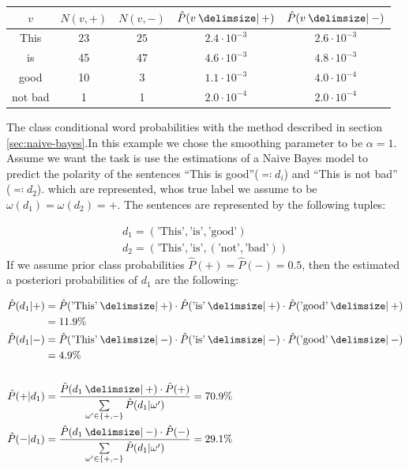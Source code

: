 \begin{center}
\begin{tabular}{|c|c|c|c|c}
$v$ & $N(v, +)$ & $N(v,-)$ & $\hat{P}(v\given +)$ & $\hat{P}(v \given -)$ \\
\hline
This & $23$ & $25$ & $2.4\cdot 10^{-3}$  & $2.6 \cdot 10^{-3}$\\
is & 45 & 47 & $4.6\cdot 10^{-3}$ &  $4.8\cdot 10^{-3}$ \\
good & 10 & 3 & $1.1 \cdot 10^{-3}$ & $4.0 \cdot 10^{-4}$ \\
not bad & 1 & 1 & $2.0 \cdot 10^{-4}$ & $2.0 \cdot 10^{-4}$   
\end{tabular}
\end{center}

The class conditional word probabilities with the method described in
section \ref{sec:naive-bayes}.In this example we chose the smoothing parameter
to be $\alpha = 1$.
Assume we want the task is use the estimations of a Naive Bayes model to
predict the polarity of the sentences ``This is good''($\eqqcolon d_i$) and
``This is not bad'' ($\eqqcolon d_2$).
which are represented, whos true label we assume to be $\omega(d_1) =
\omega(d_2) = +$. The sentences are represented by the following tuples:

\begin{equation*}
\begin{split}
d_1 = (\text{'This'}, \text{'is'}, \text{'good'}) \\
d_2 = (\text{'This'}, \text{'is'}, (\text{'not'}, \text{'bad'}))
\end{split}
\end{equation*}
If we assume prior class probabilities $\hat{P}(+) = \hat{P}(-) = 0.5$,
then the estimated a posteriori probabilities of $d_1$ are the following:

\begin{equation*}
\begin{split}
\hat{P}(d_1|+) &=  \hat{P}(\text{'This'} \given +) \cdot \hat{P}(\text{'is'} \given +) \cdot \hat{P}(\text{'good'} \given
+)\\ &= 11.9 \% \\
\hat{P}(d_1|-) &=  \hat{P}(\text{'This'} \given -) \cdot \hat{P}(\text{'is'} \given -) \cdot \hat{P}(\text{'good'} \given
-) \\ &= 4.9 \% \\
\\
\hat{P}(+|d_1) &= \frac{\hat{P}(d_1 \given +)\cdot \hat{P}(+)}{\sum\limits_{\omega' \in \{+,-\}}
\hat{P}(d_1 | \omega')} = 70.9 \% \\
\hat{P}(-|d_1) &= \frac{\hat{P}(d_1 \given -)\cdot
\hat{P}(-)}{\sum\limits_{\omega' \in \{+,-\}} \hat{P}(d_1 | \omega')} = 29.1 \%
\end{split}
\end{equation*}

